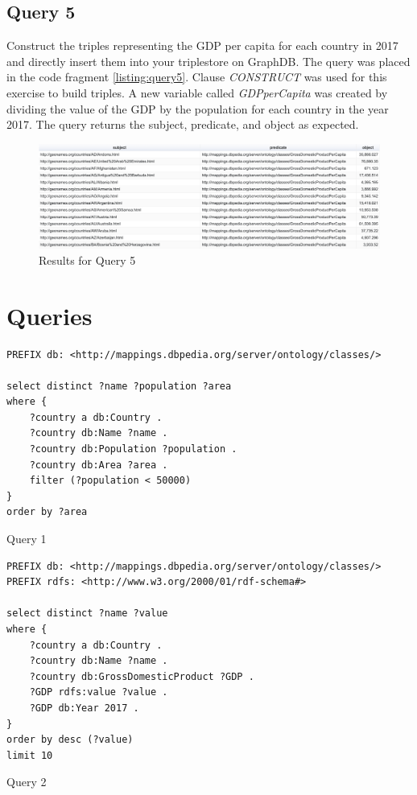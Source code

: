 \documentclass[11pt]{article}
\begin{document}
\subsection{Query 5\label{subsec:query5}} 
Construct the triples representing the GDP per capita for each country in 2017 and directly insert them into your triplestore on GraphDB. The query was placed in the code fragment \ref{listing:query5}. Clause \textit{CONSTRUCT} was used for this exercise to build triples. A new variable called \textit{GDPperCapita} was created by dividing the value of the GDP by the population for each country in the year 2017. The query returns the subject, predicate, and object as expected.

\begin{figure}[H]
  \centering
   \includegraphics[width=1\textwidth]{results/Q5.png}
  \caption{Results for Query 5}
  \label{fig:q5}
\end{figure}

\appendix
\newpage
\section{Queries}
\begin{listing}[!hbt]
\begin{verbatim}
PREFIX db: <http://mappings.dbpedia.org/server/ontology/classes/>

select distinct ?name ?population ?area
where { 
    ?country a db:Country .
    ?country db:Name ?name .
    ?country db:Population ?population .
    ?country db:Area ?area .
    filter (?population < 50000)
} 
order by ?area
\end{verbatim}
\caption{Query 1}
\label{listing:query1}
\end{listing}

\begin{listing}[!hbt]
\begin{verbatim}
PREFIX db: <http://mappings.dbpedia.org/server/ontology/classes/>
PREFIX rdfs: <http://www.w3.org/2000/01/rdf-schema#> 

select distinct ?name ?value
where { 
    ?country a db:Country .
    ?country db:Name ?name .
    ?country db:GrossDomesticProduct ?GDP .
    ?GDP rdfs:value ?value .
    ?GDP db:Year 2017 .
} 
order by desc (?value)
limit 10
\end{verbatim}
\caption{Query 2}
\label{listing:query2}
\end{listing}
\end{document}
